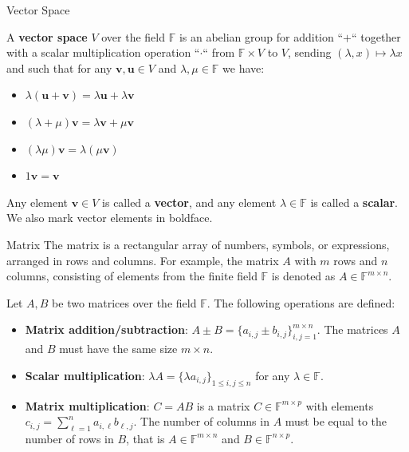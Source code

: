 \documentclass{zkdl-presentation-template}
\begin{document}
    \begin{frame}{Vector Space}
        \begin{definition}
            A \textbf{vector space} $V$ over the field $\mathbb{F}$ is an abelian group for addition
            ``$+$`` together with a scalar multiplication operation ``$\cdot$`` from $\mathbb{F} \times V$
            to $V$, sending $(\lambda,x) \mapsto \lambda x$ and such that for any 
            $\boldsymbol{v},\boldsymbol{u} \in V$ and $\lambda,\mu \in \mathbb{F}$ we have:
            \begin{itemize}
                \item $\lambda(\boldsymbol{u}+\boldsymbol{v}) = \lambda \boldsymbol{u} + \lambda \boldsymbol{v}$
                \item $(\lambda + \mu)\boldsymbol{v} = \lambda \boldsymbol{v} + \mu \boldsymbol{v}$
                \item $(\lambda \mu)\boldsymbol{v} = \lambda(\mu \boldsymbol{v})$
                \item $1\boldsymbol{v} = \boldsymbol{v}$
            \end{itemize}

            Any element $\boldsymbol{v} \in V$ is called a \textbf{vector}, and any element
            $\lambda \in \mathbb{F}$ is called a \textbf{scalar}. We also mark vector elements in 
            boldface.
        \end{definition}
    \end{frame}

    \begin{frame}{Matrix}
        The matrix is a rectangular array of numbers, symbols, or expressions, arranged in rows and 
        columns. For example, the matrix $A$ with $m$ rows and $n$ columns, consisting of elements 
        from the finite field $\mathbb{F}$ is denoted as $A \in \mathbb{F}^{m \times n}$. 

        \begin{definition}
            Let $A,B$ be two matrices over the field $\mathbb{F}$. The following operations are defined:
            \begin{itemize}
                \item \textbf{Matrix addition/subtraction}: $A \pm B = \{a_{i,j} \pm b_{i,j}\}_{i,j=1}^{m \times n}$. The matrices $A$ and $B$ must have the same size $m \times n$.
                \item \textbf{Scalar multiplication}: $\lambda A = \{\lambda a_{i,j}\}_{1\leq i,j \leq n}$ for any $\lambda \in \mathbb{F}$.
                \item \textbf{Matrix multiplication}: $C = AB$ is a matrix $C \in \mathbb{F}^{m \times p}$ with elements $c_{i,j} = \sum_{\ell=1}^{n} a_{i,\ell}b_{\ell,j}$. The number of columns in $A$ must be equal to the number of rows in $B$, that is $A \in \mathbb{F}^{m \times n}$ and $B \in \mathbb{F}^{n \times p}$.
            \end{itemize}
        \end{definition}
    \end{frame}
\end{document}
